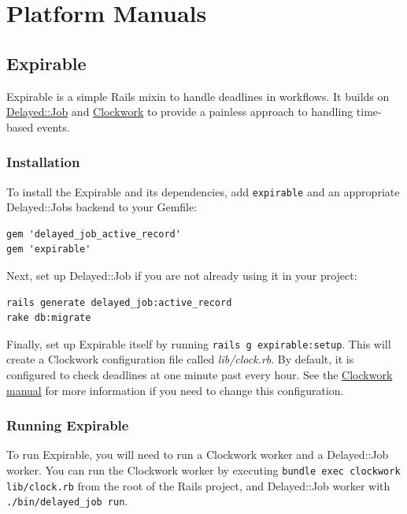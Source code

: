 \documentclass[document.tex]{subfiles}
\begin{document}
\chapter{Platform Manuals}
\label {ch:appendix-manuals}


\section{Expirable}
\label {sec:expirable-manual}

Expirable is a simple Rails mixin to handle deadlines in workflows.
It builds on \href{https://github.com/collectiveidea/delayed\_job}{Delayed::Job}
and \href{https://github.com/tomykaira/clockwork}{Clockwork} to provide a painless approach
to handling time-based events.

\subsection{Installation}

To install the Expirable and its dependencies, add {\tt expirable} and an
appropriate Delayed::Jobs backend to your Gemfile:

\begin{lstlisting}
gem 'delayed_job_active_record'
gem 'expirable'

\end{lstlisting}   %

Next, set up Delayed::Job if you are not already using it in your project:

\begin{lstlisting}
rails generate delayed_job:active_record
rake db:migrate

\end{lstlisting}   %

Finally, set up Expirable itself by running {\tt rails g expirable:setup}.
This will create a Clockwork configuration file called \emph{lib/clock.rb}.
By default, it is configured to check deadlines at one minute past every hour.
See the \href{https://github.com/tomykaira/clockwork\#clockwork---a-clock-process-to-replace-cron--}{Clockwork manual}
for more information if you need to change this configuration.

\subsection{Running Expirable}

To run Expirable, you will need to run a Clockwork worker and a Delayed::Job worker.
You can run the Clockwork worker by executing {\tt bundle exec clockwork lib/clock.rb}
from the root of the Rails project, and Delayed::Job worker with {\tt ./bin/delayed\_job run}.
\end{document}
